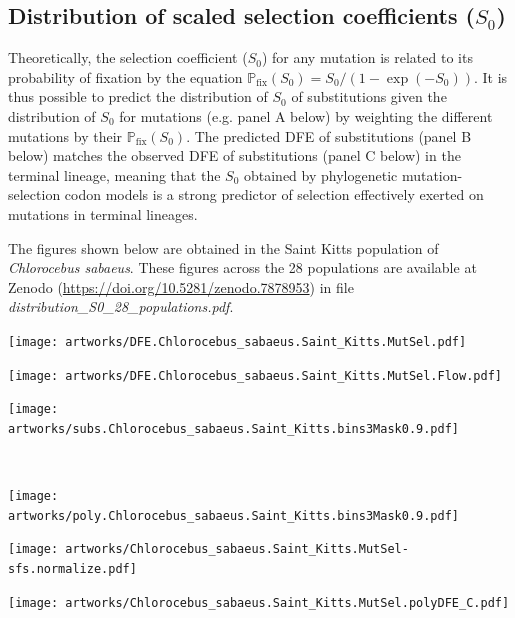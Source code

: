 \documentclass{article}
\newcommand{\proba}{\mathbb{P}}
\newcommand{\Sphy}{S_{0}}
\begin{document}
    \newpage
    \subsection{Distribution of scaled selection coefficients ($\Sphy$)}\label{subsec:expectedDFE}

    Theoretically, the selection coefficient ($\Sphy$) for any mutation is related to its probability of fixation by the equation $\proba_{\text{fix}} (\Sphy) = \Sphy/(1-\exp(-\Sphy)) $.
    It is thus possible to predict the distribution of $\Sphy$ of substitutions given the distribution of $\Sphy$ for mutations (e.g. panel A below) by weighting the different mutations by their $\proba_{\text{fix}} (\Sphy)$.
    The predicted DFE of substitutions (panel B below) matches the observed DFE of substitutions (panel C below) in the terminal lineage, meaning that the $\Sphy$ obtained by phylogenetic mutation-selection codon models is a strong predictor of selection effectively exerted on mutations in terminal lineages.

    The figures shown below are obtained in the Saint Kitts population of \textit{Chlorocebus sabaeus}.
    These figures across the 28 populations are available at Zenodo (\url{https://doi.org/10.5281/zenodo.7878953}) in file \textit{distribution\_S0\_28\_populations.pdf}.\\

    \begin{minipage}{0.32\linewidth}
        \texttt{[image: artworks/DFE.Chlorocebus\_sabaeus.Saint\_Kitts.MutSel.pdf]}
    \end{minipage}
    \begin{minipage}{0.32\linewidth}
        \texttt{[image: artworks/DFE.Chlorocebus\_sabaeus.Saint\_Kitts.MutSel.Flow.pdf]}
    \end{minipage}
    \begin{minipage}{0.32\linewidth}
        \texttt{[image: artworks/subs.Chlorocebus\_sabaeus.Saint\_Kitts.bins3Mask0.9.pdf]}
    \end{minipage}
    \\
    \begin{minipage}{0.32\linewidth}
        \texttt{[image: artworks/poly.Chlorocebus\_sabaeus.Saint\_Kitts.bins3Mask0.9.pdf]}
    \end{minipage}
    \begin{minipage}{0.32\linewidth}
        \texttt{[image: artworks/Chlorocebus\_sabaeus.Saint\_Kitts.MutSel-sfs.normalize.pdf]}
    \end{minipage}
    \begin{minipage}{0.32\linewidth}
        \texttt{[image: artworks/Chlorocebus\_sabaeus.Saint\_Kitts.MutSel.polyDFE\_C.pdf]}
    \end{minipage}
\end{document}
